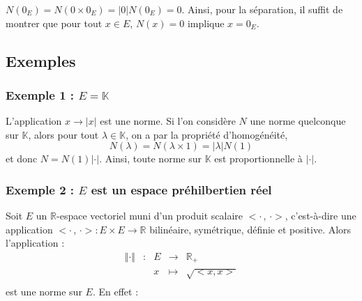 \documentclass[a4paper,10pt]{report}
\begin{document}
 \begin{rem} $N(0_E) = N(0 \times 0_E) = \vert 0 \vert N(0_E) = 0$. Ainsi, pour la séparation, il suffit de montrer que pour tout $x \in E$, $N(x)=0$ implique $x=0_E$.
 \end{rem}
 
 \subsection{Exemples}
 \subsubsection{Exemple 1 : $E= \mathbb{K}$}

\noindent L'application $x \rightarrow \vert x \vert$ est une norme. Si l'on considère $N$ une norme quelconque sur $\mathbb{K}$, alors pour tout $\lambda \in \mathbb{K}$, on a par la propriété d'homogénéité,
$$ N(\lambda) = N( \lambda \times 1) = \vert \lambda \vert N(1)$$
et donc $N =N(1) \vert \cdot \vert$. Ainsi, toute norme sur $\mathbb{K}$ est proportionnelle à $\vert \cdot \vert$.

\subsubsection{Exemple 2 : $E$ est un espace préhilbertien réel}

\noindent Soit $E$ un $\mathbb{R}$-espace vectoriel muni d'un produit scalaire $<\cdot \, , \,\cdot>$, c'est-à-dire une application $<\cdot \, , \,\cdot> : E \times E \rightarrow \mathbb{R}$ bilinéaire, symétrique, définie et positive. Alors l'application :
$$ \begin{array}{ccccl}
\Vert \cdot \Vert & : & E & \rightarrow & \mathbb{R}_+ \\
& & x & \mapsto & \sqrt{<x,x>} \\
\end{array}$$ 
est une norme sur $E$. En effet :
\end{document}

